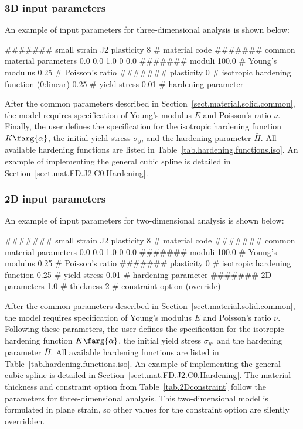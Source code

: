 \subsubsection{3D input parameters}
An example of input parameters for three-dimensional analysis is shown 
below:
\begin{inputfile}
####### small strain J2 plasticity
8     # material code
####### common material parameters
0.0    0.0    1.0
0      0.0
####### moduli
100.0 # Young's modulus
0.25  # Poisson's ratio
####### plasticity
0     # isotropic hardening function (0:linear)
0.25  # yield stress
0.01  # hardening parameter
\end{inputfile}
After the common parameters described in 
Section~\ref{sect.material.solid.common}, the 
model requires specification of Young's modulus 
$E$ and Poisson's ratio $\nu$. Finally, the user defines the specification for the isotropic hardening function $K\farg{\alpha}$, the initial 
yield stress $\sigma_{y}$, and the hardening parameter $\bar{H}$. All available hardening functions are listed in Table~\ref{tab.hardening.functions.iso}. An example of implementing the general cubic spline is detailed in Section~\ref{sect.mat.FD.J2.C0.Hardening}. 

\subsubsection{2D input parameters}
An example of input parameters for two-dimensional analysis is shown 
below:
\begin{inputfile}
####### small strain J2 plasticity
8     # material code
####### common material parameters
0.0    0.0    1.0
0      0.0
####### moduli
100.0 # Young's modulus
0.25  # Poisson's ratio
####### plasticity
0     # isotropic hardening function
0.25  # yield stress
0.01  # hardening parameter
####### 2D parameters
1.0   # thickness
2     # constraint option (override)
\end{inputfile}
After the common parameters described in 
Section~\ref{sect.material.solid.common}, the 
model requires specification of Young's modulus 
$E$ and Poisson's ratio $\nu$. Following these parameters, 
the user defines the specification for the isotropic hardening function $K\farg{\alpha}$, the initial 
yield stress $\sigma_{y}$, and the hardening parameter $\bar{H}$. All available hardening functions are listed in Table~\ref{tab.hardening.functions.iso}. An example of implementing the general cubic spline is detailed in Section~\ref{sect.mat.FD.J2.C0.Hardening}. 
The material thickness and 
constraint option from Table~\ref{tab.2Dconstraint} 
follow the parameters for three-dimensional analysis.
This two-dimensional model is formulated in plane strain,
so other values for the constraint option are silently
overridden.

